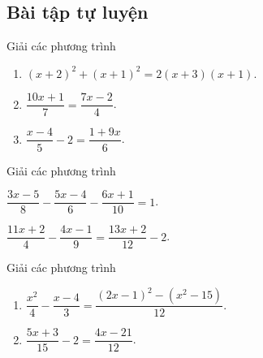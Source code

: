\subsection{Bài tập tự luyện}
\begin{bt}%
	Giải các phương trình
	\begin{enumerate}
		\item $\left(x+2\right)^2+\left(x+1\right)^2=2(x+3)\left(x+1\right)$.
		\item $\dfrac{10x+1}{7}=\dfrac{7x-2}{4}$.
		\item $\dfrac{x-4}{5}-2=\dfrac{1+9x}{6}$.
	\end{enumerate}
\end{bt}
\begin{bt}%
	Giải các phương trình
	\begin{enumEX}{2}
		\item $\dfrac{3x-5}{8}-\dfrac{5x-4}{6}-\dfrac{6x+1}{10}=1$.
		\item $\dfrac{11x+2}{4}-\dfrac{4x-1}{9}=\dfrac{13x+2}{12}-2$.
	\end{enumEX}
\end{bt}
\begin{bt}%
	Giải các phương trình
	\begin{enumerate}
		\item $\dfrac{x^2}{4}-\dfrac{x-4}{3}=\dfrac{\left(2x-1\right)^2-\left(x^2-15\right)}{12}$.
		\item $\dfrac{5x+3}{15}-2=\dfrac{4x-21}{12}$.
	\end{enumerate}
\end{bt}

